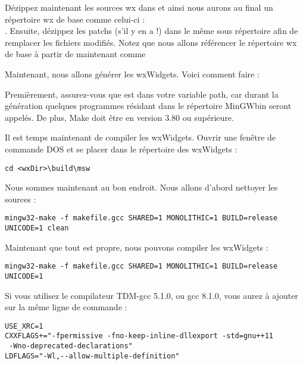 Dézippez maintenant les sources wx dans  et ainsi nous aurons au final un répertoire wx de base comme celui-ci :\\
. Ensuite, dézippez les patchs (s'il y en a !) dans le même sous répertoire afin de remplacer les fichiers modifiés. Notez que nous allons référencer le répertoire wx de base à partir de maintenant comme 


Maintenant, nous allons générer les wxWidgets. Voici comment faire :

Premièrement, assurez-vous que  est dans votre variable path, car durant la génération quelques programmes résidant dans le répertoire MinGW\osp bin seront appelés. De plus, Make doit être en version 3.80 ou supérieure.

Il est temps maintenant de compiler les wxWidgets. Ouvrir une fenêtre de commande DOS et se placer dans le répertoire des wxWidgets :

\begin{verbatim}
cd <wxDir>\build\msw
\end{verbatim}

Nous sommes maintenant au bon endroit. Nous allons d'abord nettoyer les sources :

\begin{verbatim}
mingw32-make -f makefile.gcc SHARED=1 MONOLITHIC=1 BUILD=release UNICODE=1 clean
\end{verbatim}

Maintenant que tout est propre, nous pouvons compiler les wxWidgets :

\begin{verbatim}
mingw32-make -f makefile.gcc SHARED=1 MONOLITHIC=1 BUILD=release UNICODE=1
\end{verbatim}

Si vous utilisez le compilateur TDM-gcc 5.1.0, ou gcc 8.1.0, vous aurez à ajouter sur la même ligne de commande : 
\begin{verbatim}
USE_XRC=1
CXXFLAGS+="-fpermissive -fno-keep-inline-dllexport -std=gnu++11
 -Wno-deprecated-declarations"
LDFLAGS="-Wl,--allow-multiple-definition"
\end{verbatim}  

